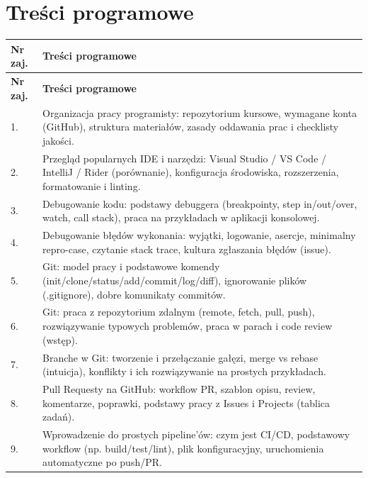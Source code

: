 \documentclass[12pt, a4paper]{article}
\newcommand{\thdrule}{\noalign{\global\setlength{\extrarowheight}{0pt}}}
\newcommand{\thdend}{\noalign{\global\setlength{\extrarowheight}{3pt}}}
\begin{document}
\section{Treści programowe}

{\scriptsize
\begin{longtable}{m{1.5cm}m{14.5cm}}
\thdrule\toprule
\rowcolor{pjatkRed} {\color{white}\textbf{Nr zaj.}} & {\color{white}\textbf{Treści programowe}} \\
\midrule\thdend
\endfirsthead
\thdrule\toprule
\rowcolor{pjatkRed} {\color{white}\textbf{Nr zaj.}} & {\color{white}\textbf{Treści programowe}} \\
\midrule\thdend
\endhead
  \rowcolor{tableRowLight} 1. & Organizacja pracy programisty: repozytorium kursowe, wymagane konta (GitHub), struktura materiałów, zasady oddawania prac i checklisty jakości. \\
  \rowcolor{tableRowAlt} 2. & Przegląd popularnych IDE i narzędzi: Visual Studio / VS Code / IntelliJ / Rider (porównanie), konfiguracja środowiska, rozszerzenia, formatowanie i linting. \\
  \rowcolor{tableRowLight} 3. & Debugowanie kodu: podstawy debuggera (breakpointy, step in/out/over, watch, call stack), praca na przykładach w aplikacji konsolowej. \\
  \rowcolor{tableRowAlt} 4. & Debugowanie błędów wykonania: wyjątki, logowanie, asercje, minimalny repro-case, czytanie stack trace, kultura zgłaszania błędów (issue). \\
  \rowcolor{tableRowLight} 5. & Git: model pracy i podstawowe komendy (init/clone/status/add/commit/log/diff), ignorowanie plików (.gitignore), dobre komunikaty commitów. \\
  \rowcolor{tableRowAlt} 6. & Git: praca z repozytorium zdalnym (remote, fetch, pull, push), rozwiązywanie typowych problemów, praca w parach i code review (wstęp). \\
  \rowcolor{tableRowLight} 7. & Branche w Git: tworzenie i przełączanie gałęzi, merge vs rebase (intuicja), konflikty i ich rozwiązywanie na prostych przykładach. \\
  \rowcolor{tableRowAlt} 8. & Pull Requesty na GitHub: workflow PR, szablon opisu, review, komentarze, poprawki, podstawy pracy z Issues i Projects (tablica zadań). \\
  \rowcolor{tableRowLight} 9. & Wprowadzenie do prostych pipeline’ów: czym jest CI/CD, podstawowy workflow (np. build/test/lint), plik konfiguracyjny, uruchomienia automatyczne po push/PR. \\

\end{longtable}}
\end{document}
